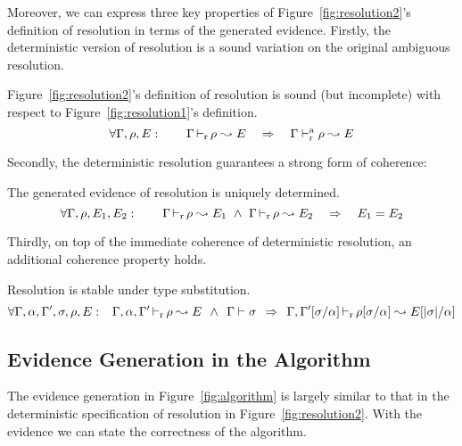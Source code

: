 Moreover, we can express three key properties of Figure~\ref{fig:resolution2}'s
definition of resolution in terms of the generated evidence.
Firstly, the deterministic version of resolution is a sound variation on the original ambiguous resolution.
\begin{lemma}[Soundness]
Figure~\ref{fig:resolution2}'s definition of resolution is sound (but
incomplete) with respect to Figure~\ref{fig:resolution1}'s definition.
\[\forall \Gamma, \rho, E: \quad\quad \Gamma \mathop{\vdash_{\mathrm{r}}} \rho \leadsto E \quad\Rightarrow\quad \Gamma \vdash^\mathrm{a}_{\mathrm{r}} \rho \leadsto E \]
\end{lemma}
Secondly, the deterministic resolution guarantees a strong form of coherence:
\begin{lemma}[Determinacy]
The generated evidence of resolution is uniquely determined.
\[\forall \Gamma, \rho, E_1, E_2: \quad\quad \Gamma \mathop{\vdash_{\mathrm{r}}} \rho \leadsto E_1 ~\wedge~ \Gamma \mathop{\vdash_{\mathrm{r}}} \rho \leadsto E_2 \quad\Rightarrow\quad E_1 = E_2 \]
\end{lemma}
Thirdly, on top of the immediate coherence of deterministic resolution, 
an additional coherence property holds.  
\begin{lemma}[Stability]
Resolution is stable under type substitution.
\[\forall \Gamma,\alpha,\Gamma',\sigma,\rho, E: \hskip4.5pt\
\Gamma,\alpha,\Gamma' \mathop{\vdash_{\mathrm{r}}} \rho \leadsto E \hskip4.5pt\wedge\hskip4.5pt \Gamma \vdash \sigma
\hskip4.5pt\Rightarrow\hskip4.5pt 
\Gamma,\Gamma'[\sigma/\alpha] \mathop{\vdash_{\mathrm{r}}} \rho[\sigma/\alpha] \leadsto E[|\sigma|/\alpha] \]
\end{lemma}

\subsection{Evidence Generation in the Algorithm}

The evidence generation in Figure~\ref{fig:algorithm} is largely similar to
that in the deterministic specification of resolution in
Figure~\ref{fig:resolution2}.
With the evidence we can state the correctness of the algorithm.

